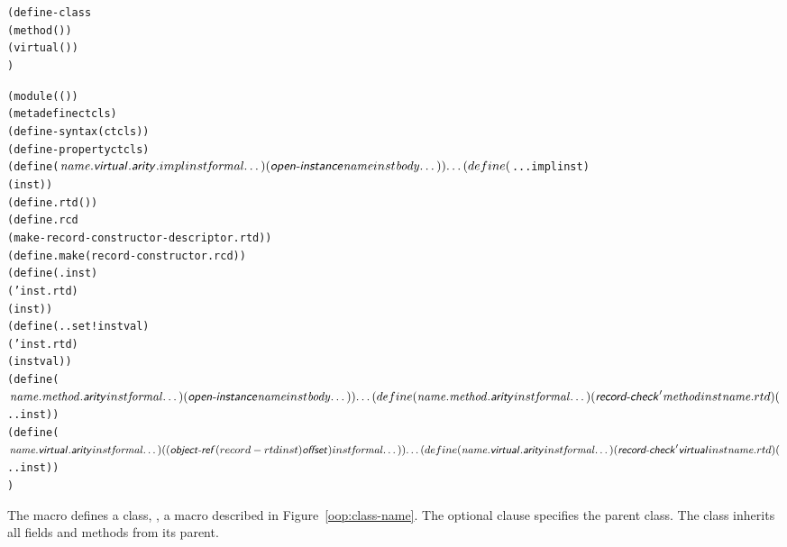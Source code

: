 \begin{syntax}\begin{alltt}
(define-class 
  (method (  \etc)  \etc) \etc
  (virtual (  \etc)  \etc) \etc
  )\strut\end{alltt}
\end{syntax}
\expandsto{}\begin{alltt}\antipar
(module ((  \etc))
  (meta define ctcls )
  (define-syntax  ( ctcls))
  (define-property   ctcls)
  (define ($\var{name}.\nl{virtual}.\nl{arity}.impl inst \var{formal} \etc)
    (\nl{open-instance} \var{name} inst \var{body} \etc)) \etc
  (define ($...impl inst  \etc)
    (  inst  \etc)) \etc
  (define .rtd ( ))
  (define .rcd
    (make-record-constructor-descriptor .rtd  ))
  (define .make (record-constructor .rcd))
  (define (. inst)
    ( ' inst .rtd)
    ( inst )) \etc
  (define (..set! inst val)
     ( ' inst .rtd)
     ( inst  val)) \etc
  (define ($\var{name}.\var{method}.\nl{arity} inst \var{formal} \etc)
    (\nl{open-instance} \var{name} inst \var{body} \etc)) \etc
  (define (\var{name}.\var{method}.\nl{arity} inst \var{formal} \etc)
    (\nl{record-check} '\var{method} inst \var{name}.rtd)
    ($.. inst  \etc)) \etc
  (define ($\var{name}.\nl{virtual}.\nl{arity} inst \var{formal} \etc)
    ((\nl{object-ref} (record-rtd inst) \nl{offset}) inst \var{formal} \etc)) \etc
  (define (\var{name}.\nl{virtual}.\nl{arity} inst \var{formal} \etc)
    (\nl{record-check} '\nl{virtual} inst \var{name}.rtd)
    ($.. inst  \etc)) \etc
  )\end{alltt}

The  macro defines a class, , a macro described in
Figure~\ref{oop:class-name}. The optional  clause specifies the parent
class. The class inherits all fields and methods from its parent.

